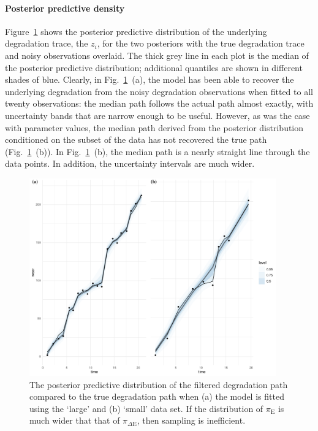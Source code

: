 \paragraph*{Posterior predictive density}
Figure~\ref{fig:ppd-z} shows the posterior predictive distribution of the underlying degradation trace, the $z_i$, for the two posteriors with the true degradation trace and noisy observations overlaid. The thick grey line in each plot is the median of the posterior predictive distribution; additional quantiles are shown in different shades of blue. Clearly, in Fig.~\ref{fig:ppd-z}~(a), the model has been able to recover the underlying degradation from the noisy degradation observations when fitted to all twenty observations: the median path follows the actual path almost exactly, with uncertainty bands that are narrow enough to be useful. However, as was the case with parameter values, the median path derived from the posterior distribution conditioned on the subset of the data has not recovered the true path (Fig.~\ref{fig:ppd-z}~(b)). In Fig.~\ref{fig:ppd-z}~(b), the median path is a nearly straight line through the data points. In addition, the uncertainty intervals are much wider.

\begin{figure}
  \centering
  \includegraphics[width=0.95\textwidth]{./figures/ch-4/ppd_z_a.pdf}
  \caption{The posterior predictive distribution of the filtered degradation path compared to the true degradation path when (a) the model is fitted using the `large' and (b) `small' data set. If the distribution of $\pi_\text{E}$ is much wider that that of $\pi_{\Delta\text{E}}$, then sampling is inefficient.}
  \label{fig:ppd-z}
\end{figure}

